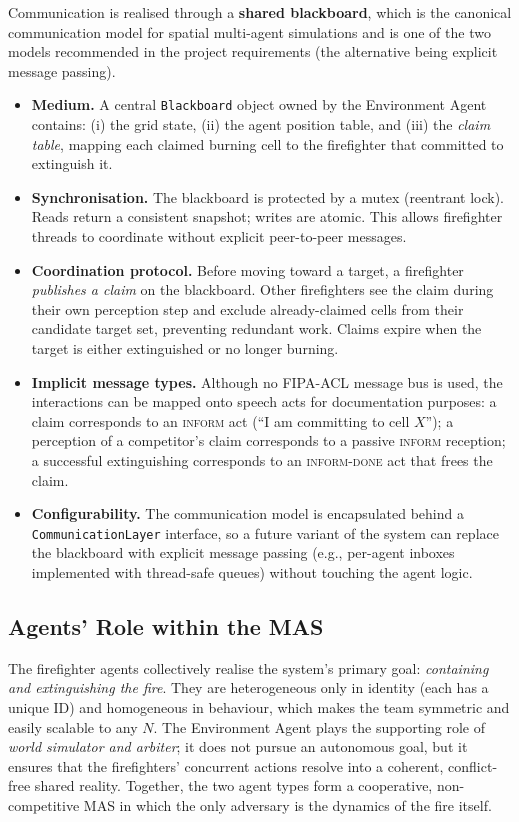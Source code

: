\documentclass[a4paper, 11pt]{article}
\begin{document}
Communication is realised through a \textbf{shared blackboard}, which is
the canonical communication model for spatial multi-agent simulations and
is one of the two models recommended in the project requirements (the
alternative being explicit message passing).

\begin{itemize}[leftmargin=*]
\item \textbf{Medium.} A central \texttt{Blackboard} object owned by the
Environment Agent contains: (i) the grid state, (ii) the agent
position table, and (iii) the \emph{claim table}, mapping each claimed
burning cell to the firefighter that committed to extinguish it.
\item \textbf{Synchronisation.} The blackboard is protected by a mutex
(reentrant lock). Reads return a consistent snapshot; writes are atomic.
This allows firefighter threads to coordinate without explicit
peer-to-peer messages.
\item \textbf{Coordination protocol.} Before moving toward a target,
a firefighter \emph{publishes a claim} on the blackboard. Other
firefighters see the claim during their own perception step and
exclude already-claimed cells from their candidate target set,
preventing redundant work. Claims expire when the target is either
extinguished or no longer burning.
\item \textbf{Implicit message types.} Although no FIPA-ACL message bus
is used, the interactions can be mapped onto speech acts for
documentation purposes: a claim corresponds to an \textsc{inform} act
(``I am committing to cell $X$''); a perception of a competitor's claim
corresponds to a passive \textsc{inform} reception; a successful
extinguishing corresponds to an \textsc{inform-done} act that frees the
claim.
\item \textbf{Configurability.} The communication model is encapsulated
behind a \texttt{CommunicationLayer} interface, so a future variant of
the system can replace the blackboard with explicit message passing
(e.g., per-agent inboxes implemented with thread-safe queues) without
touching the agent logic.
\end{itemize}

\subsection{Agents' Role within the MAS}

The firefighter agents collectively realise the system's primary goal:
\emph{containing and extinguishing the fire}. They are heterogeneous only
in identity (each has a unique ID) and homogeneous in behaviour, which
makes the team symmetric and easily scalable to any $N$. The Environment
Agent plays the supporting role of \emph{world simulator and arbiter};
it does not pursue an autonomous goal, but it ensures that the
firefighters' concurrent actions resolve into a coherent, conflict-free
shared reality. Together, the two agent types form a cooperative,
non-competitive MAS in which the only adversary is the dynamics of the
fire itself.
\end{document}
